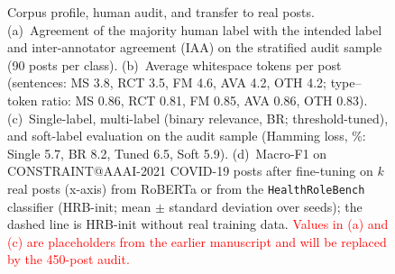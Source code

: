 \begin{figure}[t]
\caption{Corpus profile, human audit, and transfer to real posts. (a)~Agreement of the majority human label with the intended label and inter-annotator agreement (IAA) on the stratified audit sample (90 posts per class). (b)~Average whitespace tokens per post (sentences: MS 3.8, RCT 3.5, FM 4.6, AVA 4.2, OTH 4.2; type--token ratio: MS 0.86, RCT 0.81, FM 0.85, AVA 0.86, OTH 0.83). (c)~Single-label, multi-label (binary relevance, BR; threshold-tuned), and soft-label evaluation on the audit sample (Hamming loss, \%: Single 5.7, BR 8.2, Tuned 6.5, Soft 5.9). (d)~Macro-F1 on CONSTRAINT@AAAI-2021 COVID-19 posts after fine-tuning on $k$ real posts (x-axis) from RoBERTa or from the \texttt{HealthRoleBench} classifier (HRB-init; mean $\pm$ standard deviation over seeds); the dashed line is HRB-init without real training data. \textcolor{red}{Values in (a) and (c) are placeholders from the earlier manuscript and will be replaced by the 450-post audit.}}
\label{fig:overview}
\vspace{-0.3cm}
\end{figure}